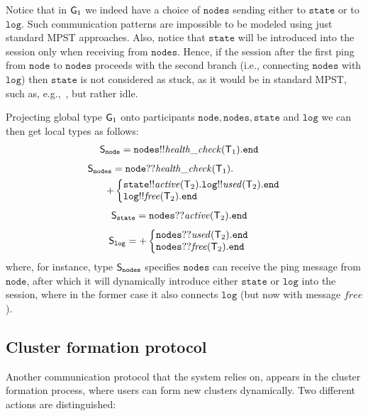 Notice that in ${\sf G}_1$ we indeed have a choice of $\mathtt{nodes}$ sending either to $\mathtt{state}$ or to $\mathtt{log}$. Such communication patterns are impossible to be modeled using just standard MPST approaches. 
Also, notice that $\mathtt{state}$ will be introduced into the session only when receiving from $\mathtt{nodes}$. 
Hence, if the session after the first ping from $\mathtt{node}$ to $\mathtt{nodes}$ proceeds with the second branch (i.e., connecting $\mathtt{nodes}$ with $\mathtt{log}$) then $\mathtt{state}$ is not considered as stuck, as it would be in standard MPST, such as, e.g.,~\cite{HondaYC08}, but rather idle. 

Projecting global type ${\sf G}_1$ onto participants $\mathtt{node}, \mathtt{nodes}, \mathtt{state}$ and $\mathtt{log}$ we can then get local types as follows:
\begin{align*}
{\mathsf S}_\mathtt{node}  & = 
\mathtt{nodes}{!!}\mathit{health{\_}check}({\mathsf T}_1).\mathtt{end}
\end{align*}
\begin{align*}
\ST_\mathtt{nodes} & = 
\mathtt{node}{??}\mathit{health{\_}check}(\T_1). \\
& \hspace{-2mm}
{+} 
\left\{
\begin{array}{@{}l@{}}
\mathtt{state}{!!}\mathit{active}(\T_2).\mathtt{log}{!!}\mathit{used}(\T_2).\tend\\
\mathtt{log}{!!}\mathit{free}(\T_2).\tend
\end{array} \right.
\end{align*}
\begin{align*}
{\mathsf S}_\mathtt{state} &= 
\mathtt{nodes}{??}\mathit{active}({\mathsf T}_2).\mathtt{end}
\end{align*}
\begin{align*}
\ST_\mathtt{log} &= 
{+}
\left\{
\begin{array}{@{}l@{}}
\mathtt{nodes}{??}\mathit{used}(\T_2).\tend\\
\mathtt{nodes}{??}\mathit{free}(\T_2).\tend
\end{array} \right.
\end{align*}
\noindent
where, for instance, type ${\mathsf S}_\mathtt{nodes}$ specifies $\mathtt{nodes}$ can receive the ping message from $\mathtt{node}$, after which it will dynamically introduce either $\mathtt{state}$ or $\mathtt{log}$ into the session, where in the former case it also connects $\mathtt{log}$ (but now with message $\mathit{free}$). 
%
%
\subsection{Cluster formation protocol}\label{sec:cluster_formation_protocol}
%
Another communication protocol that the system relies on, appears in the cluster formation process, where users can form new clusters dynamically. Two different actions are distinguished:

